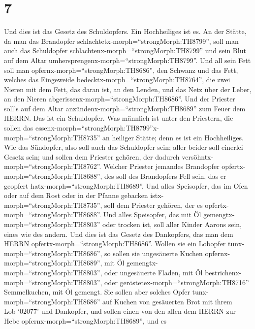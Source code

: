 \hypertarget{section-6}{%
\section{7}\label{section-6}}

 Und dies ist das Gesetz des Schuldopfers. Ein Hochheiliges
ist es.  An der Stätte, da man das Brandopfer
schlachtetx-morph=``strongMorph:TH8799'', soll man auch das Schuldopfer
schlachtenx-morph=``strongMorph:TH8799'' und sein Blut auf dem Altar
umhersprengenx-morph=``strongMorph:TH8799''.  Und all sein
Fett soll man opfernx-morph=``strongMorph:TH8686'', den Schwanz und das
Fett, welches das Eingeweide bedecktx-morph=``strongMorph:TH8764'',
 die zwei Nieren mit dem Fett, das daran ist, an den Lenden,
und das Netz über der Leber, an den Nieren
abgerissenx-morph=``strongMorph:TH8686''.  Und der Priester
soll's auf dem Altar anzündenx-morph=``strongMorph:TH8689'' zum Feuer
dem HERRN. Das ist ein Schuldopfer.  Was männlich ist unter
den Priestern, die sollen das
essenx-morph=``strongMorph:TH8799''x-morph=``strongMorph:TH8735'' an
heiliger Stätte; denn es ist ein Hochheiliges.  Wie das
Sündopfer, also soll auch das Schuldopfer sein; aller beider soll
einerlei Gesetz sein; und sollen dem Priester gehören, der dadurch
versöhntx-morph=``strongMorph:TH8762''.  Welcher Priester
jemandes Brandopfer opfertx-morph=``strongMorph:TH8688'', des soll des
Brandopfers Fell sein, das er geopfert
hatx-morph=``strongMorph:TH8689''.  Und alles Speisopfer,
das im Ofen oder auf dem Rost oder in der Pfanne gebacken
istx-morph=``strongMorph:TH8735'', soll dem Priester gehören, der es
opfertx-morph=``strongMorph:TH8688''.  Und alles
Speisopfer, das mit Öl gemengtx-morph=``strongMorph:TH8803'' oder
trocken ist, soll aller Kinder Aarons sein, eines wie des andern.
 Und dies ist das Gesetz des Dankopfers, das man dem HERRN
opfertx-morph=``strongMorph:TH8686''.  Wollen sie ein
Lobopfer tunx-morph=``strongMorph:TH8686'', so sollen sie ungesäuerte
Kuchen opfernx-morph=``strongMorph:TH8689'', mit Öl
gemengtx-morph=``strongMorph:TH8803'', oder ungesäuerte Fladen, mit Öl
bestrichenx-morph=``strongMorph:TH8803'', oder
geröstetex-morph=``strongMorph:TH8716'' Semmelkuchen, mit Öl gemengt.
 Sie sollen aber solches Opfer
tunx-morph=``strongMorph:TH8686'' auf Kuchen von gesäuerten Brot mit
ihrem Lob-`02077' und Dankopfer,  und sollen einen von den
allen dem HERRN zur Hebe opfernx-morph=``strongMorph:TH8689'', und es

